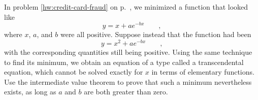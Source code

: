 In problem \ref{hw:credit-card-fraud} on p.~\pageref{hw:credit-card-fraud},
we minimized a function that looked like
\begin{equation*}
  y = x+ae^{-bx} \qquad ,
\end{equation*}
where $x$, $a$, and $b$ were all positive. Suppose instead that
the function had been
\begin{equation*}
  y = x^2+ae^{-bx} \qquad ,
\end{equation*}
with the corresponding quantities still being positive.
Using the same technique to find its minimum, we obtain an equation
of a type called a transcendental equation, which cannot be solved
exactly for $x$ in terms of elementary functions. Use the intermediate value
theorem to prove that such a minimum nevertheless exists, as long as $a$ and
$b$ are both greater than zero.
